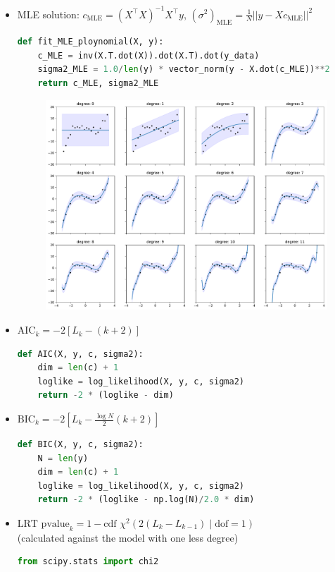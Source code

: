 \begin{itemize}
\newpage
	\item MLE solution: $c_\text{MLE}= (X^\top X)^{-1} X^\top y$, \quad $(\sigma^2)_\text{MLE} = \frac{1}{N}||y - X c_\text{MLE}||^2$
\begin{lstlisting}[language=python]
def fit_MLE_ploynomial(X, y):
    c_MLE = inv(X.T.dot(X)).dot(X.T).dot(y_data)
    sigma2_MLE = 1.0/len(y) * vector_norm(y - X.dot(c_MLE))**2
    return c_MLE, sigma2_MLE
\end{lstlisting}
	\begin{figure}[h]
		\centering
		\includegraphics[width=\textwidth]{./figs/03-linear-regression-fits.pdf}
	\end{figure}

\newpage
	\item $\text{AIC}_k = -2 [L_k - (k+2)]$
\begin{lstlisting}[language=python]
def AIC(X, y, c, sigma2):
	dim = len(c) + 1
	loglike = log_likelihood(X, y, c, sigma2)
	return -2 * (loglike - dim)
\end{lstlisting}

	\item $\text{BIC}_k = -2 [L_k - \frac{\log N}{2}(k+2)]$
\begin{lstlisting}[language=python]
def BIC(X, y, c, sigma2):
	N = len(y)
	dim = len(c) + 1
	loglike = log_likelihood(X, y, c, sigma2)
	return -2 * (loglike - np.log(N)/2.0 * dim)
\end{lstlisting}

	\item $\text{LRT pvalue}_{k} = 1 - \text{cdf }\chi^2(2(L_k - L_{k-1})\;|\;\text{dof} = 1)$ \\
	(calculated against the model with one less degree)
\begin{lstlisting}[language=python]
from scipy.stats import chi2


\end{lstlisting}
\end{itemize}
